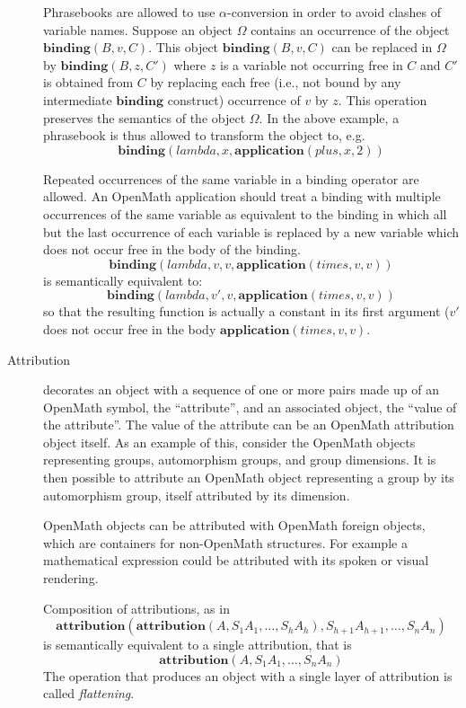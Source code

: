 \documentclass{report}
\def\textquote#1{``#1''}
\def\OM{OpenMath\xspace}
\def\application#1{\mathbf{application}(#1)}
\def\binding#1{\mathbf{binding}(#1)}
\def\attribution#1{\mathbf{attribution}(#1)}
\begin{document}
\begin{description}
Phrasebooks are allowed to use $\alpha$-conversion in order to avoid clashes of
variable names. Suppose an object $\Omega$ contains an occurrence of the object
$\binding{B,v,C}$.  This object $\binding{B,v,C}$ can be replaced in $\Omega$ by
$\binding{B,z,C'}$ where $z$ is a variable not occurring free in $C$ and $C'$ is obtained
from $C$ by replacing each free (i.e., not bound by any intermediate $\mathbf{binding}$
construct) occurrence of $v$ by $z$.  This operation preserves the semantics of the object
$\Omega$. In the above example, a phrasebook is thus allowed to transform the object to,
e.g.
\[\binding{lambda,x,\application{plus,x,2}}\]


Repeated occurrences of the same variable in a binding operator
  are allowed. An \OM application should treat a binding with
  multiple occurrences of the same variable as equivalent to the
  binding in which all but the last occurrence of each variable is
  replaced by a new variable which does not occur free in the body of
  the binding.
  \[\binding{lambda,v,v,\application{times,v,v}}\]
is semantically
  equivalent to: 
  \[\binding{lambda,v',v,\application{times,v,v}}\]
  so that the resulting function is actually a constant in its first argument ($v'$ does
  not occur free in the body $\application{times,v,v}$.

\item[Attribution] decorates an object with a sequence of one or more pairs made up of an
  \OM symbol, the \textquote{attribute}, and an associated object, the \textquote{value of
    the attribute}.  The value of the attribute can be an \OM attribution object
  itself. As an example of this, consider the \OM objects representing groups,
  automorphism groups, and group dimensions. It is then possible to attribute an \OM
  object representing a group by its automorphism group, itself attributed by its
  dimension.

  \OM objects can be attributed with \OM foreign objects, which are containers for non-\OM
  structures.  For example a mathematical expression could be attributed with its spoken
  or visual rendering.



Composition of attributions, as in
\[\attribution{\attribution{A,S_1 A_1,\ldots, S_h A_h}, S_{h+1} A_{h+1},\ldots, S_n A_n}\] 
is semantically equivalent to a single attribution, that is
\[\attribution{A,S_1 A_1,\ldots, S_n A_n}\] 
The operation that produces an object with a single layer of attribution is called
\emph{flattening}.


\end{description}
\end{document}
